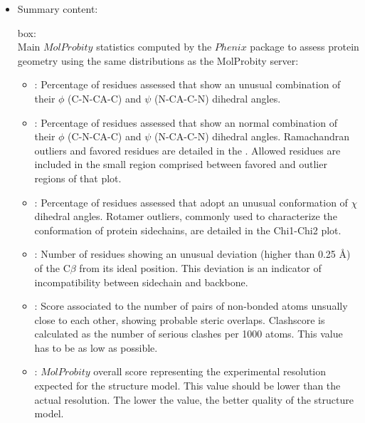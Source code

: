 \begin{itemize}
 \item Summary content:
 
   box:\\Main $MolProbity$ statistics computed by the $Phenix$ package to assess protein geometry using the same distributions as the MolProbity server:
      \begin{itemize}     
        \item {}: Percentage of residues assessed that show an unusual combination of their $\phi$ (C-N-CA-C) and $\psi$ (N-CA-C-N) dihedral angles.
        \item {}: Percentage of residues assessed that show an normal combination of their $\phi$ (C-N-CA-C) and $\psi$ (N-CA-C-N) dihedral angles. Ramachandran outliers and favored residues are detailed in the . Allowed residues are included in the small region comprised between favored and outlier regions of that plot.
        \item {}: Percentage of residues assessed that adopt an unusual conformation of $\chi$ dihedral angles. Rotamer outliers, commonly used to characterize the conformation of protein sidechains, are detailed in the Chi1-Chi2 plot.
        \item {}: Number of residues showing an unusual deviation (higher than 0.25 \AA) of the C{$\beta$} from its ideal position. This deviation is an indicator of incompatibility between sidechain and backbone. 
        \item {}: Score associated to the number of pairs of non-bonded atoms unsually close to each other, showing probable steric overlaps. Clashscore is calculated as the number of serious clashes per 1000 atoms. This value has to be as low as possible.
        \item {}: $MolProbity$ overall score representing the experimental resolution expected for the structure model. This value should be lower than the actual resolution. The lower the value, the better quality of the structure model.
      \end{itemize}

\end{itemize}
